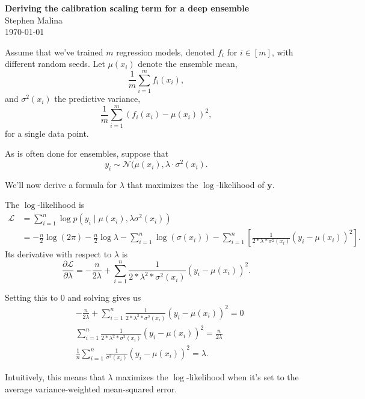 \documentclass[12pt]{article}
\begin{document}
\begin{flushleft}
\textbf{Deriving the calibration scaling term for a deep ensemble} \\
Stephen Malina \\
\today
\end{flushleft}

\vspace{0.1in}

\normalsize

Assume that we've trained \( m \) regression models, denoted \( f_i \) for \( i \in [m] \), with different random seeds. Let \( \mu(x_i) \) denote
the ensemble mean,
\[ \frac{1}{m} \sum_{i=1}^m f_i(x_i), \]
and \( \sigma^2(x_i) \) the predictive variance,
\[ \frac{1}{m} \sum_{i=1}^m (f_i(x_i) - \mu(x_i))^2, \]
for a single data point.

As is often done for ensembles, suppose that
\[ y_i \sim \mathcal{N}(\mu(x_i), \lambda \cdot \sigma^2(x_i). \]

We'll now derive a formula for \( \lambda \) that maximizes the \( \log \)-likelihood of \( \mathbf{y} \). 

The \( \log \)-likelihood is
\begin{align}
	\mathcal{L} &= \sum_{i=1}^n \log p(y_i \mid \mu(x_i), \lambda \sigma^2(x_i)) \\
		    &= -\frac{n}{2} \log(2\pi) - \frac{n}{2} \log \lambda - \sum_{i=1}^n \log(\sigma(x_i)) - \sum_{i=1}^n \left[ \frac{1}{2 * \lambda * \sigma^2(x_i)} \left( y_i - \mu(x_i) \right)^2 \right].
\end{align}
Its derivative with respect to \( \lambda \) is
\begin{equation}
	\frac{\partial \mathcal{L}}{\partial \lambda} = -\frac{n}{2\lambda} + \sum_{i=1}^n \frac{1}{2 * \lambda^2 * \sigma^2(x_i)} (y_i - \mu(x_i))^2.
\end{equation}

Setting this to \( 0 \) and solving gives us
\begin{align}
	& -\frac{n}{2\lambda} + \sum_{i=1}^n \frac{1}{2 * \lambda^2 * \sigma^2(x_i)} (y_i - \mu(x_i))^2 = 0 \\
	& \sum_{i=1}^n \frac{1}{2 * \lambda^2 * \sigma^2(x_i)} (y_i - \mu(x_i))^2 = \frac{n}{2 \lambda} \\
	& \frac{1}{n} \sum_{i=1}^n \frac{1}{\sigma^2(x_i)} (y_i - \mu(x_i))^2 = \lambda.
\end{align}

Intuitively, this means that \( \lambda \) maximizes the \( \log \)-likelihood when it's set to the average variance-weighted mean-squared error.
\end{document}
